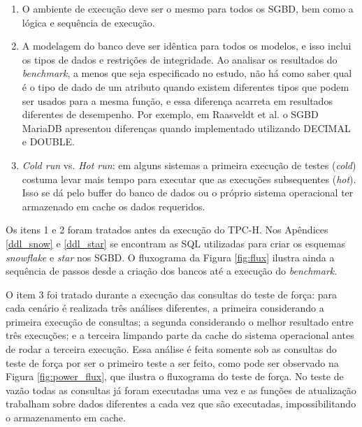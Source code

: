 \begin{enumerate}
    \item{O ambiente de execução 
    deve ser o mesmo para todos os SGBD, bem como a lógica e sequência de 
    execução.}
    \item{A modelagem do banco deve ser idêntica para todos os modelos, e isso 
    inclui os tipos de dados e restrições de integridade. Ao analisar os resultados do \textit{benchmark}, a menos 
    que seja especificado no estudo, não há como saber qual é o tipo de dado de um atributo 
    quando existem diferentes tipos que podem ser usados para a mesma função, 
    e essa diferença acarreta em resultados diferentes de desempenho. Por exemplo, 
    em Raasveldt et al. \cite{raasveldt2018fair} o SGBD MariaDB apresentou diferenças quando implementado 
    utilizando DECIMAL e DOUBLE.}
    \item{\textit{Cold run} vs. \textit{Hot run}: em alguns sistemas a primeira execução de 
    testes (\textit{cold}) costuma levar mais tempo para executar que as execuções subsequentes (\textit{hot}). 
    Isso se dá pelo buffer do banco de dados ou o próprio sistema operacional ter armazenado em 
    cache os dados requeridos.}
\end{enumerate}

Os itens 1 e 2 foram tratados antes da execução do TPC-H. Nos Apêndices \ref{ddl_snow} e \ref{ddl_star} se encontram as SQL 
utilizadas para criar os esquemas \textit{snowflake} e \textit{star} nos SGBD. O fluxograma da Figura \ref{fig:flux} 
ilustra ainda a sequência de passos desde a criação dos bancos até a execução do \textit{benchmark}. 

O item 3 foi tratado durante a execução das consultas do teste de força: para cada cenário é realizada três 
análises diferentes, a primeira considerando a primeira execução de consultas; a segunda considerando o melhor 
resultado entre três execuções; e a terceira limpando parte da cache do sistema operacional antes de 
rodar a terceira execução. Essa análise é feita somente sob as consultas do teste de força por ser o primeiro 
teste a ser feito, como pode ser observado na Figura \ref{fig:power_flux}, que ilustra o fluxograma do teste de força. No teste de vazão todas as consultas já foram executadas 
uma vez e as funções de atualização trabalham sobre dados diferentes a cada vez que são executadas, impossibilitando 
o armazenamento em cache.

